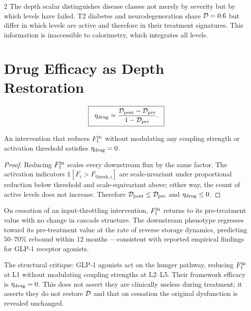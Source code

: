 \begin{multicols}{2}
The depth scalar distinguishes disease classes not merely by severity but by which levels have failed. T2 diabetes and neurodegeneration share $\mathcal{D} = 0.6$ but differ in which levels are active and therefore in their treatment signatures. This information is inaccessible to calorimetry, which integrates all levels.

\section{Drug Efficacy as Depth Restoration}
\label{sec:ch08-drug}

\begin{definition}
\label{def:ch08-eta}
\begin{equation}
\boxed{\;\;\eta_{\mathrm{drug}} = \frac{\mathcal{D}_{\mathrm{post}} - \mathcal{D}_{\mathrm{pre}}}{1 - \mathcal{D}_{\mathrm{pre}}}.\;\;}
\label{eq:ch08-eta}
\end{equation}
\end{definition}

\begin{theorem}
\label{thm:ch08-throttle}
An intervention that reduces $F^{\mathrm{in}}_1$ without modulating any coupling strength or activation threshold satisfies $\eta_{\mathrm{drug}} = 0$.
\end{theorem}

\begin{proof}
Reducing $F^{\mathrm{in}}_1$ scales every downstream flux by the same factor. The activation indicators $\mathbb{1}[F_i > F_{\mathrm{thresh},i}]$ are scale-invariant under proportional reduction below threshold and scale-equivariant above; either way, the count of active levels does not increase. Therefore $\mathcal{D}_{\mathrm{post}} \leq \mathcal{D}_{\mathrm{pre}}$ and $\eta_{\mathrm{drug}} \leq 0$.
\end{proof}

\begin{corollary}
\label{cor:ch08-rebound}
On cessation of an input-throttling intervention, $F^{\mathrm{in}}_1$ returns to its pre-treatment value with no change in cascade structure. The downstream phenotype regresses toward its pre-treatment value at the rate of reverse storage dynamics, predicting $50$--$70\%$ rebound within 12 months \citep{wilding2022, rubino2022}---consistent with reported empirical findings for GLP-1 receptor agonists.
\end{corollary}

The structural critique: GLP-1 agonists act on the hunger pathway, reducing $F^{\mathrm{in}}_1$ at L1 without modulating coupling strengths at L2--L5. Their framework efficacy is $\eta_{\mathrm{drug}} = 0$. This does not assert they are clinically useless during treatment; it asserts they do not restore $\mathcal{D}$ and that on cessation the original dysfunction is revealed unchanged.


\end{multicols}
